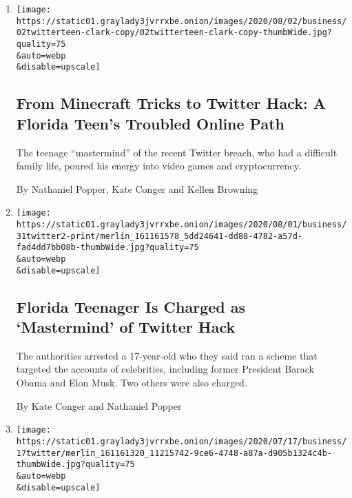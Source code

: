 \begin{enumerate}
\def\labelenumi{\arabic{enumi}.}
\item
  \href{/2020/08/02/technology/florida-teenager-twitter-hack.html}{}

  \texttt{[image: https://static01.graylady3jvrrxbe.onion/images/2020/08/02/business/02twitterteen-clark-copy/02twitterteen-clark-copy-thumbWide.jpg?quality=75\\\&auto=webp\\\&disable=upscale]}

  \hypertarget{from-minecraft-tricks-to-twitter-hack-a-florida-teens-troubled-online-path}{%
  \subsection{From Minecraft Tricks to Twitter Hack: A Florida Teen's
  Troubled Online
  Path}\label{from-minecraft-tricks-to-twitter-hack-a-florida-teens-troubled-online-path}}

  The teenage ``mastermind'' of the recent Twitter breach, who had a
  difficult family life, poured his energy into video games and
  cryptocurrency.

  By Nathaniel Popper, Kate Conger and Kellen Browning
\item
  \href{/2020/07/31/technology/twitter-hack-arrest.html}{}

  \texttt{[image: https://static01.graylady3jvrrxbe.onion/images/2020/08/01/business/31twitter2-print/merlin\_161161578\_5dd24641-dd88-4782-a57d-fad4dd7bb08b-thumbWide.jpg?quality=75\\\&auto=webp\\\&disable=upscale]}

  \hypertarget{florida-teenager-is-charged-as-mastermind-of-twitter-hack}{%
  \subsection{Florida Teenager Is Charged as `Mastermind' of Twitter
  Hack}\label{florida-teenager-is-charged-as-mastermind-of-twitter-hack}}

  The authorities arrested a 17-year-old who they said ran a scheme that
  targeted the accounts of celebrities, including former President
  Barack Obama and Elon Musk. Two others were also charged.

  By Kate Conger and Nathaniel Popper
\item
  \href{/2020/07/17/technology/twitter-hackers-interview.html}{}

  \texttt{[image: https://static01.graylady3jvrrxbe.onion/images/2020/07/17/business/17twitter/merlin\_161161320\_11215742-9ce6-4748-a87a-d905b1324c4b-thumbWide.jpg?quality=75\\\&auto=webp\\\&disable=upscale]}


\end{enumerate}
